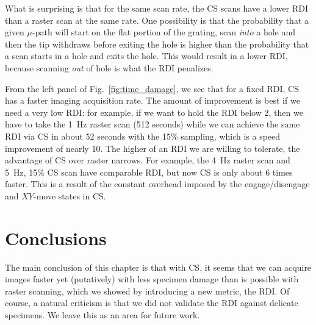 \documentclass[twocolumn,oneside]{IEEEtran/IEEEtran}
\begin{document}
What is surprising is that for the same scan rate, the CS scans have a lower RDI
than a raster scan at the same rate. One possibility is that the probability
that a given $\mu$-path will start on the flat portion of the grating, scan
\textit{into} a hole and then the tip withdraws before exiting the hole is
higher than the probability that a scan starts in a hole and exits the hole.
This would result in a lower RDI, because scanning \textit{out} of hole is what
the RDI penalizes.

From the left panel of Fig.~\ref{fig:time_damage}, we see that for a fixed RDI,
CS has a faster imaging acquisition rate. The amount of improvement is best if
we need a very low RDI: for example, if we want to hold the RDI below 2, then we
have to take the 1~Hz raster scan (512 seconds) while we can achieve the same
RDI via CS in about 52 seconds with the 15\% sampling, which is a speed
improvement of nearly 10. The higher of an RDI we are willing to tolerate, the
advantage of CS over raster narrows. For example, the 4~Hz raster scan and 5~Hz,
15\% CS scan have comparable RDI, but now CS is only about 6 times faster. This
is a result of the constant overhead imposed by the engage/disengage and
$XY$-move states in CS.




%   

\section{Conclusions}\label{sec:conclusions}
The main conclusion of this chapter is that with CS, it seems that we can
acquire images faster yet (putatively) with less specimen damage than is
possible with raster scanning, which we showed by introducing a new metric, the
RDI. Of course, a natural criticism is that we did not validate the RDI against
delicate specimens. We leave this as an area for future work.








\end{document}
